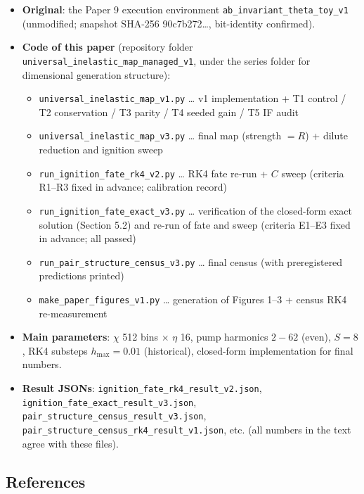 \documentclass[
  a4paper,
]{article}
\providecommand{\tightlist}{%
  \setlength{\itemsep}{0pt}\setlength{\parskip}{0pt}}
\begin{document}
\begin{itemize}
\tightlist
\item
  \textbf{Original}: the Paper 9 execution environment
  \texttt{ab\_invariant\_theta\_toy\_v1} (unmodified; snapshot SHA-256
  90c7b272\ldots, bit-identity confirmed).
\item
  \textbf{Code of this paper} (repository folder
  \texttt{universal\_inelastic\_map\_managed\_v1}, under the series
  folder for dimensional generation structure):

  \begin{itemize}
  \tightlist
  \item
    \texttt{universal\_inelastic\_map\_v1.py} \ldots{} v1 implementation
    + T1 control / T2 conservation / T3 parity / T4 seeded gain / T5 IF
    audit
  \item
    \texttt{universal\_inelastic\_map\_v3.py} \ldots{} final map
    (strength \(=R\)) + dilute reduction and ignition sweep
  \item
    \texttt{run\_ignition\_fate\_rk4\_v2.py} \ldots{} RK4 fate re-run +
    \(C\) sweep (criteria R1--R3 fixed in advance; calibration record)
  \item
    \texttt{run\_ignition\_fate\_exact\_v3.py} \ldots{} verification of
    the closed-form exact solution (Section 5.2) and re-run of fate and
    sweep (criteria E1--E3 fixed in advance; all passed)
  \item
    \texttt{run\_pair\_structure\_census\_v3.py} \ldots{} final census
    (with preregistered predictions printed)
  \item
    \texttt{make\_paper\_figures\_v1.py} \ldots{} generation of Figures
    1--3 + census RK4 re-measurement
  \end{itemize}
\item
  \textbf{Main parameters}: \(\chi\) 512 bins \(\times\) \(\eta\) 16,
  pump harmonics \(2\!-\!62\) (even), \(S=8\), RK4 substeps
  \(h_{\max}=0.01\) (historical), closed-form implementation for final
  numbers.
\item
  \textbf{Result JSONs}: \texttt{ignition\_fate\_rk4\_result\_v2.json},
  \texttt{ignition\_fate\_exact\_result\_v3.json},
  \texttt{pair\_structure\_census\_result\_v3.json},
  \texttt{pair\_structure\_census\_rk4\_result\_v1.json}, etc. (all
  numbers in the text agree with these files).
\end{itemize}

\subsection{References}\label{references}
\end{document}
